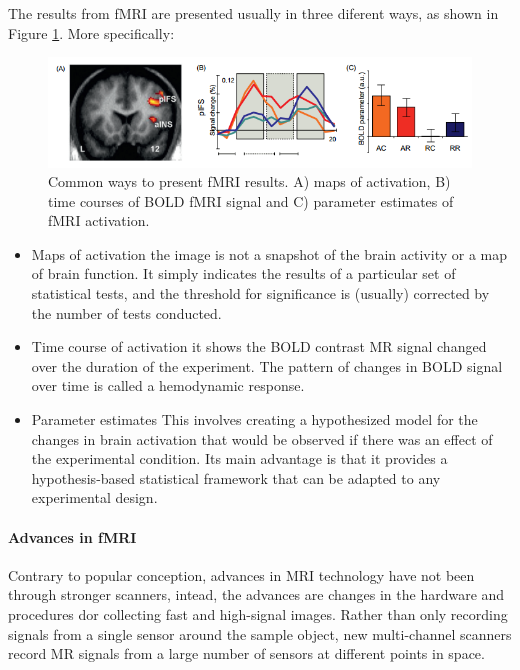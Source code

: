 \documentclass[12pt,article,oneside,a4paper]{memoir}
\begin{document}
The results from fMRI are presented usually in three diferent ways, as shown in Figure \ref{fig:fMRI-results}. More specifically:
\begin{figure}
  \centering
  \includegraphics[width=\textwidth]{imgs/fMRI-results.png}
  \caption{Common ways to present fMRI results. A) maps of activation, B) time courses of BOLD fMRI signal and C) parameter estimates of fMRI activation.}
  \label{fig:fMRI-results}
\end{figure}

\begin{itemize}
\item Maps of activation
\subitem the image is not a snapshot of the brain activity or a map of brain function. It simply indicates the results of a particular set of statistical tests, and the threshold for significance is (usually) corrected by the number of tests conducted.
\item Time course of activation
\subitem it shows the BOLD contrast MR signal changed over the duration of the experiment. The pattern of changes in BOLD signal over time is called a hemodynamic response.
\item Parameter estimates
\subitem This involves creating a hypothesized model for the changes in brain activation that would be observed if there was an effect of the experimental condition. Its main advantage is that it provides a hypothesis-based statistical framework that can be adapted to any experimental design.
\end{itemize}

\paragraph{Advances in fMRI}
Contrary to popular conception, advances in MRI technology have not been through stronger scanners, intead, the advances are changes in the hardware and procedures dor collecting fast and high-signal images. Rather than only recording signals from a single sensor around the sample object, new multi-channel scanners record MR signals from a large number of sensors at different points in space.
\end{document}
